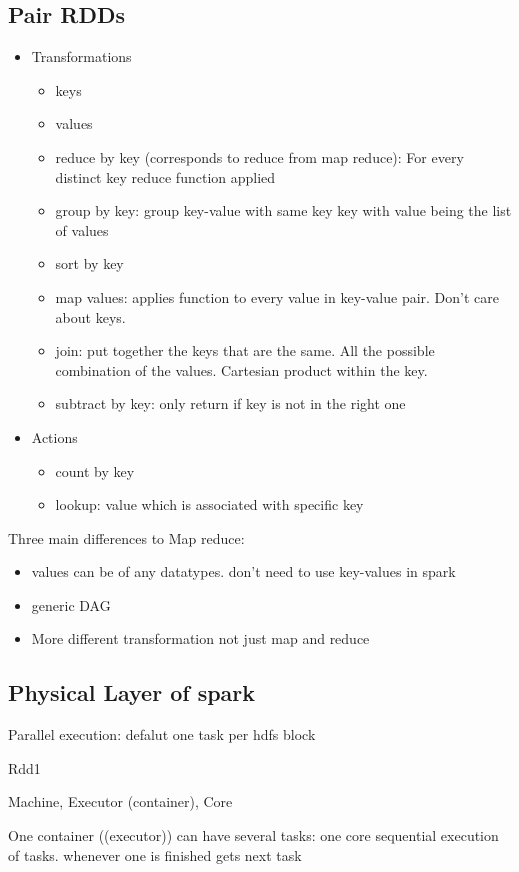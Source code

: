 \subsection{Pair RDDs}
\begin{itemize}
    \item Transformations
    \begin{itemize}
        \item keys
        \item values
        \item reduce by key (corresponds to reduce from map reduce): For every distinct key reduce function applied
        \item group by key: group key-value with same key \textrightarrow key with value being the list of values
        \item sort by key
        \item map values: applies function to every value in key-value pair. Don't care about keys.
        \item join: put together the keys that are the same.
        All the possible combination of the values. Cartesian product within the key.
        \item subtract by key: only return if key is not in the right one
    \end{itemize}
    \item Actions
    \begin{itemize}
        \item count by key
        \item lookup: value which is associated with specific key
    \end{itemize}
\end{itemize}

Three main differences to Map reduce:
\begin{itemize}
    \item values can be of any datatypes. don't need to use key-values in spark
    \item generic DAG
    \item More different transformation not just map and reduce
\end{itemize}


\subsection{Physical Layer of spark}
Parallel execution: defalut one task per hdfs block

Rdd1 \textrightarrow

Machine, Executor (container), Core

One container ((executor)) can have several tasks:
one core sequential execution of tasks. whenever one is finished gets next task



